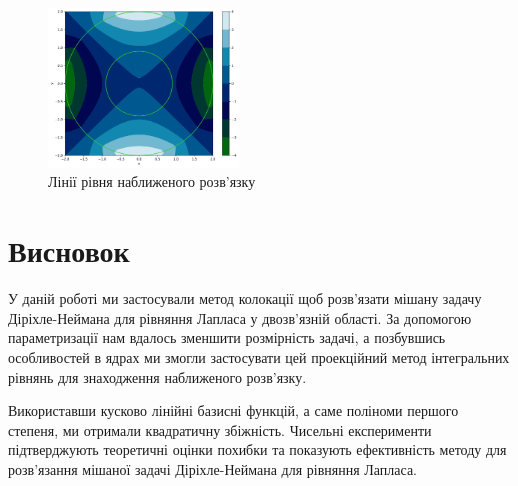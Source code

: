 \documentclass[14pt,a4paper]{extarticle}
\newcounter{e}
\numberwithin{equation}{section}
\numberwithin{figure}{section}
\begin{document}
\begin{figure}[!htb]
	\centering
	\includegraphics[width=0.45\textwidth]{resources/ex2_contourf.pdf}
	\caption{Лінії рівня наближеного розв'язку}
	\label{fig:ex2_contourf}
\end{figure}

  \newpage
  \thispagestyle{empty}
  \section{Висновок}
  
  У даній роботі ми застосували метод колокації щоб розв'язати мішану задачу Діріхле-Неймана для рівняння Лапласа у двозв’язній області. За допомогою параметризації нам вдалось зменшити розмірність задачі, а  позбувшись особливостей в ядрах ми змогли застосувати цей проекційний метод інтегральних рівнянь для знаходження наближеного розв'язку. 
  
  Використавши кусково лінійні базисні функцій, а саме поліноми першого степеня, ми отримали квадратичну збіжність. Чисельні експерименти підтверджують теоретичні оцінки похибки та показують ефективність методу для розв’язання мішаної задачі Діріхле-Неймана для рівняння Лапласа.
	
 \newpage 

\nocite{kress2012linear}
\nocite{chapko2009altrating}
\nocite{chapko2009numerical}
\nocite{atkinson2009}

\printbibliography[title={Бібліографія}]
\end{document}
